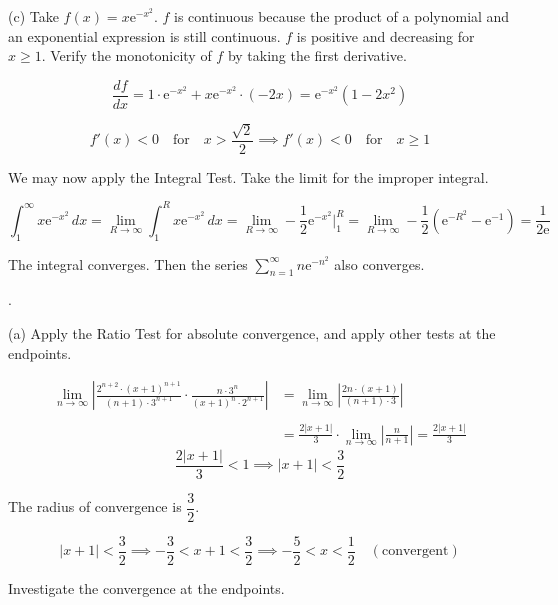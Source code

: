 \documentclass{article}
\begin{document}
\hfill

\hfill

\noindent (c) Take $f(x)=x\mathrm{e}^{-x^2}$. $f$ is continuous because the product of a polynomial and an exponential expression is still continuous. $f$ is positive and decreasing for $x\geq1$. Verify the monotonicity of $f$ by taking the first derivative.

\[\frac{df}{dx}=1\cdot\mathrm{e}^{-x^2}+x\mathrm{e}^{-x^2}\cdot(-2x)=\mathrm{e}^{-x^2}\left(1-2x^2\right)\]

\[f'(x)<0\quad\text{for}\quad x>\frac{\sqrt2}2\implies f'(x)<0\quad\text{for}\quad x\geq1\]

\hfill

\noindent We may now apply the Integral Test. Take the limit for the improper integral.

\[\int_1^{\infty}x\mathrm{e}^{-x^2}\,dx=\lim_{R\to\infty}\int_1^Rx\mathrm{e}^{-x^2}\,dx=\lim_{R\to\infty}-\frac12\mathrm{e}^{-x^2}\Bigg|_1^R=\lim_{R\to\infty}-\frac12\left(\mathrm{e}^{-R^2}-\mathrm{e^{-1}}\right)=\frac1{2\mathrm{e}}\]

\hfill

\noindent The integral converges. Then the series $\displaystyle\sum_{n=1}^{\infty}n\mathrm{e}^{-n^2}$ also converges.

\hfill

.

\hfill

\noindent (a) Apply the Ratio Test for absolute convergence, and apply other tests at the endpoints.

\begin{align*}\lim_{n\to\infty}\left|\frac{2^{n+2}\cdot(x+1)^{n+1}}{(n+1)\cdot3^{n+1}}\cdot\frac{n\cdot3^n}{(x+1)^n\cdot2^{n+1}}\right|&=\lim_{n\to\infty}\left|\frac{2n\cdot(x+1)}{(n+1)\cdot3}\right|\\\\&=\frac{2|x+1|}3\cdot\lim_{n\to\infty}\left|\frac{n}{n+1}\right|=\frac{2|x+1|}3\end{align*}
\[\frac{2|x+1|}3<1\implies|x+1|<\frac32\]

\hfill

\noindent The radius of convergence is $\boxed{\dfrac32}$.

\hfill

\[|x+1|<\frac32\implies-\frac32<x+1<\frac32\implies-\frac52<x<\frac12\quad(\text{convergent})\]

\hfill

\noindent Investigate the convergence at the endpoints.
\end{document}
